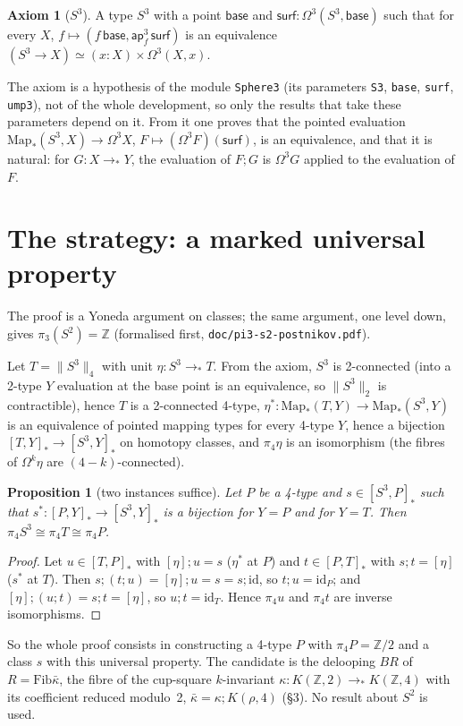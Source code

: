 \documentclass[11pt]{amsart}
\newtheorem{proposition}[theorem]{Proposition}
\theoremstyle{definition}
\newtheorem{axiom}[theorem]{Axiom}
\theoremstyle{remark}
\newcommand{\Om}{\Omega}
\newcommand{\Map}{\mathrm{Map}_*}
\newcommand{\Z}{\mathbb{Z}}
\newcommand{\code}[1]{\texttt{#1}}
\newcommand{\hc}[2]{[#1,#2]_*}
\newcommand{\Fib}{\mathrm{Fib}}
\newcommand{\tr}[1]{\|#1\|}
\newcommand{\cls}[1]{[#1]}
\newcommand{\kb}{\bar\kappa}
\begin{document}
\begin{axiom}[$S^3$]\label{a:s3}
A type $S^3$ with a point $\mathsf{base}$ and $\mathsf{surf}:\Om^3(S^3,\mathsf{base})$
such that for every $X$, $f\mapsto(f\,\mathsf{base},\mathsf{ap}^3_f\,\mathsf{surf})$ is
an equivalence $(S^3\to X)\simeq(x:X)\times\Om^3(X,x)$.
\end{axiom}

The axiom is a hypothesis of the module \code{Sphere3} (its parameters \code{S3},
\code{base}, \code{surf}, \code{ump3}), not of the whole development, so only the results
that take these parameters depend on it. From it one proves that the pointed evaluation
$\Map(S^3,X)\to\Om^3X$, $F\mapsto(\Om^3F)(\mathsf{surf})$, is an equivalence, and that it
is natural: for $G:X\to_*Y$, the evaluation of $F;G$ is $\Om^3G$ applied to the
evaluation of $F$.

\section{The strategy: a marked universal property}

The proof is a Yoneda argument on classes; the same argument, one level down, gives
$\pi_3(S^2)=\Z$ (formalised first, \code{doc/pi3-s2-postnikov.pdf}).

Let $T=\tr{S^3}_4$ with unit $\eta:S^3\to_*T$. From the axiom, $S^3$ is 2-connected
(into a 2-type $Y$ evaluation at the base point is an equivalence, so $\tr{S^3}_2$ is
contractible), hence $T$ is a 2-connected 4-type, $\eta^*:\Map(T,Y)\to\Map(S^3,Y)$ is an
equivalence of pointed mapping types for every 4-type $Y$, hence a bijection
$\hc TY\to\hc{S^3}Y$ on homotopy classes, and $\pi_4\eta$ is an isomorphism (the fibres of $\Om^k\eta$ are
$(4-k)$-connected).

\begin{proposition}[two instances suffice]\label{p:two}
Let $P$ be a 4-type and $s\in\hc{S^3}P$ such that $s^*:\hc PY\to\hc{S^3}Y$ is a
bijection for $Y=P$ and for $Y=T$. Then $\pi_4S^3\cong\pi_4T\cong\pi_4P$.
\end{proposition}
\begin{proof}
Let $u\in\hc TP$ with $\cls\eta;u=s$ ($\eta^*$ at $P$) and $t\in\hc PT$ with
$s;t=\cls\eta$ ($s^*$ at $T$). Then $s;(t;u)=\cls\eta;u=s=s;\mathrm{id}$, so
$t;u=\mathrm{id}_P$; and $\cls\eta;(u;t)=s;t=\cls\eta$, so $u;t=\mathrm{id}_T$. Hence
$\pi_4u$ and $\pi_4t$ are inverse isomorphisms.
\end{proof}

So the whole proof consists in constructing a 4-type $P$ with $\pi_4P=\Z/2$ and a
class $s$ with this universal property. The candidate is the delooping $BR$ of
$R=\Fib\kb$, the fibre of the cup-square $k$-invariant $\kappa:K(\Z,2)\to_*K(\Z,4)$ with
its coefficient reduced modulo~2, $\kb=\kappa;K(\rho,4)$ (\S3). No result about $S^2$ is
used.
\end{document}
